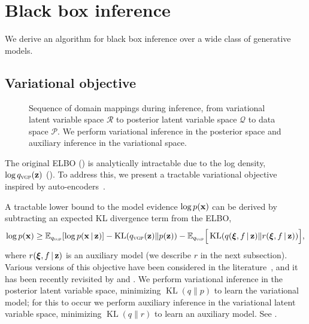 
\section{Black box inference}
\label{sec:bbi}

We derive an algorithm for black box inference over a wide
class of generative models.

\subsection{Variational objective}
\label{sec:bbi:model}

\begin{figure}[tb]
  \centering
  
\caption{Sequence of domain mappings during inference, from
variational latent variable space $\mathcal{R}$ to posterior latent
variable space $\mathcal{Q}$ to data space $\mathcal{P}$. We perform
variational inference in the posterior space and auxiliary
inference in the variational space.}
\label{fig:mappings}
\end{figure}

The original \gls{ELBO} () is
analytically intractable due to the log density,
$\log q_{\textsc{vgp}}(\boldsymbol{\mathbf{z}})$ (). To address this, we present a tractable variational
objective inspired by auto-encoders~\citep{kingma2014autoencoding}.

A tractable lower bound to the model
evidence $\log p(\boldsymbol{\mathbf{x}})$ can be derived by subtracting an expected KL
divergence term from the \gls{ELBO},
\begin{equation*}
\log p(\boldsymbol{\mathbf{x}})
\ge
\mathbb{E}_{q_{\textsc{vgp}}}[\log p(\boldsymbol{\mathbf{x}}\,|\,\boldsymbol{\mathbf{z}})]
- \operatorname{KL}(q_{\textsc{vgp}}(\boldsymbol{\mathbf{z}})\|p(\boldsymbol{\mathbf{z}}))
- \mathbb{E}_{q_{\textsc{vgp}}}\Big[
\operatorname{KL}(q(\boldsymbol{\mathbf{\xi}},f\,|\,\boldsymbol{\mathbf{z}})\|r(\boldsymbol{\mathbf{\xi}},f\,|\,\boldsymbol{\mathbf{z}}))
\Big],
\end{equation*}
where $r(\boldsymbol{\mathbf{\xi}},f\,|\,\boldsymbol{\mathbf{z}})$ is an auxiliary model (we describe $r$ in
the next subsection).
Various versions of this objective have been considered in the
literature~\citep{jaakola1998improving,agakov2004auxiliary}, and it
has been recently revisited by \citet{salimans2015markov} and
\citet{ranganath2015hierarchical}.
We perform variational inference
in the posterior latent variable space, minimizing
$\operatorname{KL}(q\|p)$ to learn the variational
model; for this to occur we perform auxiliary inference in the
variational latent variable space, minimizing
$\operatorname{KL}(q\|r)$ to learn an auxiliary model.
See .

